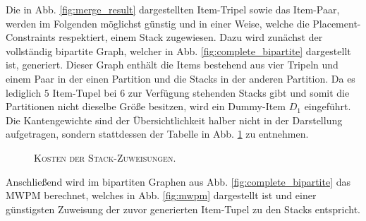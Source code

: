 Die in Abb. \ref{fig:merge_result} dargestellten Item-Tripel sowie das Item-Paar, werden im Folgenden
möglichst günstig und in einer Weise, welche die Placement-Constraints respektiert, einem Stack zugewiesen.
Dazu wird zunächst der vollständig bipartite Graph, welcher in Abb. \ref{fig:complete_bipartite} dargestellt ist,
generiert. Dieser Graph enthält die Items bestehend aus vier Tripeln und einem Paar in der einen Partition
und die Stacks in der anderen Partition.
Da es lediglich $5$ Item-Tupel bei $6$ zur Verfügung stehenden Stacks gibt und somit die Partitionen nicht dieselbe
Größe besitzen, wird ein Dummy-Item $D_1$ eingeführt.
Die Kantengewichte sind der Übersichtlichkeit halber nicht in der Darstellung aufgetragen, sondern stattdessen
der Tabelle in Abb. \ref{fig:item_tuple_costs_three_cap} zu entnehmen.
\begin{figure}[H]
\centering
{}
\caption{\textsc{Kosten der Stack-Zuweisungen}.}
\label{fig:item_tuple_costs_three_cap}
\end{figure}

Anschließend wird im bipartiten Graphen aus Abb. \ref{fig:complete_bipartite} das \textsc{MWPM} berechnet, welches
in Abb. \ref{fig:mwpm} dargestellt ist und einer günstigsten Zuweisung der zuvor generierten Item-Tupel zu den Stacks entspricht.

